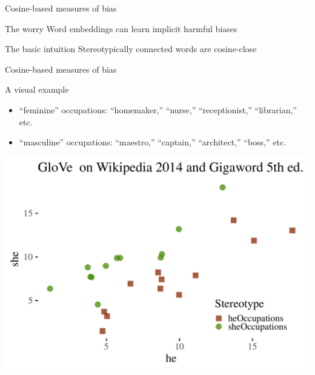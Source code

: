 \documentclass[
  10pt,
  ignorenonframetext,
  x11names, dvipsnames, bibspacing,natbib]{beamer}
\begin{document}
\begin{frame}{Cosine-based measures of bias}
\protect\hypertarget{cosine-based-measures-of-bias-2}{}
\begin{block}{The worry}
\protect\hypertarget{the-worry}{}
Word embeddings can learn implicit harmful biases

\pause
\end{block}

\begin{block}{The basic intuition}
\protect\hypertarget{the-basic-intuition}{}
Stereotypically connected words are cosine-close
\end{block}
\end{frame}

\begin{frame}{Cosine-based measures of bias}
\protect\hypertarget{cosine-based-measures-of-bias-3}{}
\begin{block}{A visual example}
\protect\hypertarget{a-visual-example}{}
\footnotesize

\begin{itemize}
\item
  ``feminine'' occupations: ``homemaker,'' ``nurse,'' ``receptionist,''
  ``librarian,'' etc.
\item
  ``masculine'' occupations: ``maestro,'' ``captain,'' ``architect,''
  ``boss,'' etc.
\end{itemize}

\normalsize

\vspace{1mm}
\footnotesize

\begin{center}\includegraphics[width=0.6\linewidth]{presentationBoston_files/figure-beamer/unnamed-chunk-1-1} \end{center}
\normalsize
\end{block}
\end{frame}
\end{document}

